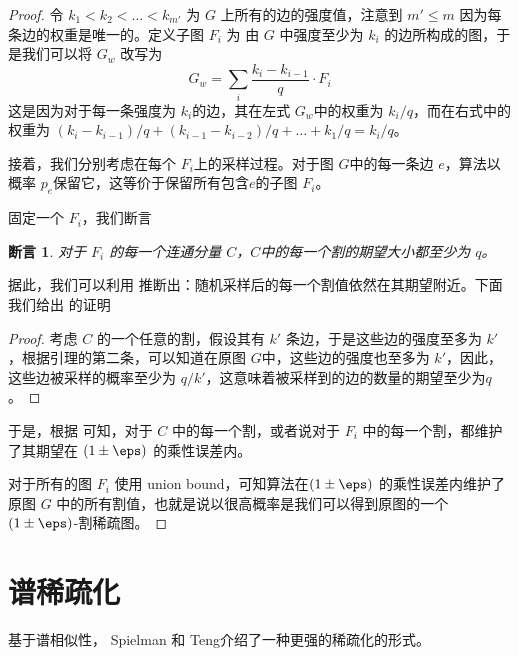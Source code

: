 \documentclass[lang=cn,newtx,10pt,scheme=chinese,chinesefont=nofont,citestyle=gb7714-2015, bibstyle=gb7714-2015]{elegantbook}
\newtheorem{claim}{断言}[chapter]   %
\begin{document}
\begin{refsection}
\begin{proof}
    令 $k_1<k_2<\dots<k_{m'}$ 为 $G$ 上所有的边的强度值，注意到 $m'\leq m$ 因为每条边的权重是唯一的。定义子图 $F_i$ 为 由 $G$ 中强度至少为 $k_i$ 的边所构成的图，于是我们可以将 $G_w$ 改写为
    \[
    G_w=\sum_i\frac{k_i-k_{i-1}}{q}\cdot F_i
    \]
    这是因为对于每一条强度为 $k_i$的边，其在左式 $G_w$中的权重为 $k_i/q$，而在右式中的权重为 $(k_i-k_{i-1})/q+(k_{i-1}-k_{i-2})/q+\dots + k_1/q=k_i/q$。

    接着，我们分别考虑在每个 $F_i$上的采样过程。对于图 $G$中的每一条边 $e$，算法以概率 $p_e$保留它，这等价于保留所有包含$e$的子图 $F_i$。

    固定一个 $F_i$，我们断言
    \begin{claim}
    \label{clm: C-cut}
        对于 $F_i$ 的每一个连通分量 $C$，$C$中的每一个割的期望大小都至少为 $q$。
    \end{claim}
    据此，我们可以利用  推断出：随机采样后的每一个割值依然在其期望附近。下面我们给出  的证明
    \begin{proof}
        考虑 $C$ 的一个任意的割，假设其有 $k'$ 条边，于是这些边的强度至多为 $k'$，根据引理的第二条，可以知道在原图 $G$中，这些边的强度也至多为 $k'$，因此，这些边被采样的概率至少为 $q/k'$，这意味着被采样到的边的数量的期望至少为$q$。
    \end{proof}

    于是，根据  可知，对于 $C$ 中的每一个割，或者说对于 $F_i$ 中的每一个割，都维护了其期望在 $(1\pm\eps)$ 的乘性误差内。

    对于所有的图 $F_i$ 使用 union bound，可知算法在$(1\pm\eps)$ 的乘性误差内维护了原图 $G$ 中的所有割值，也就是说以很高概率是我们可以得到原图的一个 $(1\pm\eps)$-割稀疏图。
\end{proof}


\section{谱稀疏化}
基于谱相似性， Spielman 和 Teng介绍了一种更强的稀疏化的形式。


\end{refsection}
\end{document}
